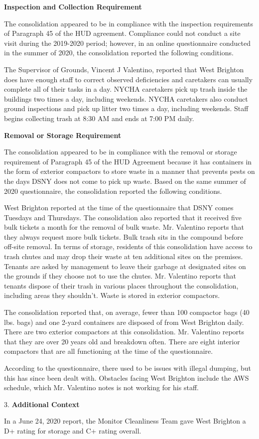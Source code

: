 

\textbf{Inspection and Collection Requirement}

The consolidation appeared to be in compliance with the inspection requirements of Paragraph 45 of the HUD agreement. Compliance could not conduct a site visit during the 2019-2020 period; however, in an online questionnaire conducted in the summer of 2020, the consolidation reported the following conditions.

The Supervisor of Grounds, Vincent J Valentino, reported that West Brighton does have enough staff to correct observed deficiencies and caretakers can usually complete all of their tasks in a day. NYCHA caretakers pick up trash inside the buildings two times a day, including weekends. NYCHA caretakers also conduct ground inspections and pick up litter two times a day, including weekends. Staff begins collecting trash at 8:30 AM and ends at 7:00 PM daily. 

\textbf{Removal or Storage Requirement}

The consolidation appeared to be in compliance with the removal or storage requirement of Paragraph  45 of the HUD Agreement because it has containers in the form of exterior compactors to store waste in a manner that prevents pests on the days DSNY does not come to pick up waste. Based on the same summer of  2020 questionnaire, the consolidation reported the following conditions.

West Brighton reported at the time of the questionnaire that DSNY comes Tuesdays and Thursdays. The consolidation also reported that it received five bulk tickets a month for the removal of bulk waste. Mr. Valentino reports that they always request more bulk tickets. Bulk trash sits in the compound before off-site removal. In terms of storage, residents of this consolidation have access to trash chutes and may drop their waste at ten additional sites on the premises.  Tenants are asked by management to leave their garbage at designated sites on the grounds if they choose not to use the chutes. Mr. Valentino reports that tenants dispose of their trash in various places throughout the consolidation, including areas they shouldn't. Waste is stored in exterior compactors. 

The consolidation reported that, on average, fewer than 100 compactor bags (40 lbs. bags) and one 2-yard containers are disposed of from West Brighton daily. There are two exterior compactors at this consolidation. Mr. Valentino reports that they are over 20 years old and breakdown often. There are eight interior compactors that are all functioning at the time of the questionnaire.

 

According to the  questionnaire, there used to be issues with illegal dumping, but this has since been dealt with. Obstacles facing West Brighton include the AWS schedule, which Mr. Valentino notes is not working for his staff.

3. \textbf{Additional Context} 

In a June 24, 2020 report, the Monitor Cleanliness Team gave West Brighton a D+ rating for storage and C+ rating overall.  